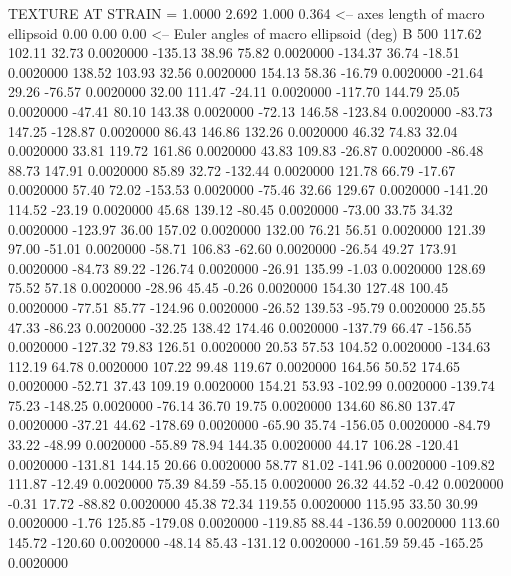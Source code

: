 TEXTURE AT STRAIN =    1.0000
   2.692   1.000   0.364  <-- axes length of macro ellipsoid
    0.00    0.00    0.00  <-- Euler angles of macro ellipsoid (deg)
B       500
  117.62  102.11   32.73   0.0020000
 -135.13   38.96   75.82   0.0020000
 -134.37   36.74  -18.51   0.0020000
  138.52  103.93   32.56   0.0020000
  154.13   58.36  -16.79   0.0020000
  -21.64   29.26  -76.57   0.0020000
   32.00  111.47  -24.11   0.0020000
 -117.70  144.79   25.05   0.0020000
  -47.41   80.10  143.38   0.0020000
  -72.13  146.58 -123.84   0.0020000
  -83.73  147.25 -128.87   0.0020000
   86.43  146.86  132.26   0.0020000
   46.32   74.83   32.04   0.0020000
   33.81  119.72  161.86   0.0020000
   43.83  109.83  -26.87   0.0020000
  -86.48   88.73  147.91   0.0020000
   85.89   32.72 -132.44   0.0020000
  121.78   66.79  -17.67   0.0020000
   57.40   72.02 -153.53   0.0020000
  -75.46   32.66  129.67   0.0020000
 -141.20  114.52  -23.19   0.0020000
   45.68  139.12  -80.45   0.0020000
  -73.00   33.75   34.32   0.0020000
 -123.97   36.00  157.02   0.0020000
  132.00   76.21   56.51   0.0020000
  121.39   97.00  -51.01   0.0020000
  -58.71  106.83  -62.60   0.0020000
  -26.54   49.27  173.91   0.0020000
  -84.73   89.22 -126.74   0.0020000
  -26.91  135.99   -1.03   0.0020000
  128.69   75.52   57.18   0.0020000
  -28.96   45.45   -0.26   0.0020000
  154.30  127.48  100.45   0.0020000
  -77.51   85.77 -124.96   0.0020000
  -26.52  139.53  -95.79   0.0020000
   25.55   47.33  -86.23   0.0020000
  -32.25  138.42  174.46   0.0020000
 -137.79   66.47 -156.55   0.0020000
 -127.32   79.83  126.51   0.0020000
   20.53   57.53  104.52   0.0020000
 -134.63  112.19   64.78   0.0020000
  107.22   99.48  119.67   0.0020000
  164.56   50.52  174.65   0.0020000
  -52.71   37.43  109.19   0.0020000
  154.21   53.93 -102.99   0.0020000
 -139.74   75.23 -148.25   0.0020000
  -76.14   36.70   19.75   0.0020000
  134.60   86.80  137.47   0.0020000
  -37.21   44.62 -178.69   0.0020000
  -65.90   35.74 -156.05   0.0020000
  -84.79   33.22  -48.99   0.0020000
  -55.89   78.94  144.35   0.0020000
   44.17  106.28 -120.41   0.0020000
 -131.81  144.15   20.66   0.0020000
   58.77   81.02 -141.96   0.0020000
 -109.82  111.87  -12.49   0.0020000
   75.39   84.59  -55.15   0.0020000
   26.32   44.52   -0.42   0.0020000
   -0.31   17.72  -88.82   0.0020000
   45.38   72.34  119.55   0.0020000
  115.95   33.50   30.99   0.0020000
   -1.76  125.85 -179.08   0.0020000
 -119.85   88.44 -136.59   0.0020000
  113.60  145.72 -120.60   0.0020000
  -48.14   85.43 -131.12   0.0020000
 -161.59   59.45 -165.25   0.0020000

